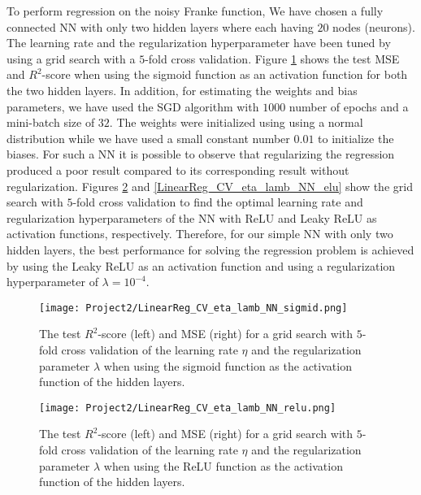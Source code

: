 \documentclass[a4paper]{article}
\begin{document}
To perform regression on the noisy Franke function, We have chosen a fully connected NN with only two hidden layers where each having $20$ nodes (neurons). The learning rate and the regularization hyperparameter have been tuned by using a grid search with a $5$-fold cross validation. Figure \ref{LinearReg_CV_eta_lamb_NN} shows the test MSE and $R^2$-score when using the sigmoid function as an activation function for both the two hidden layers. In addition, for estimating the weights and bias parameters, we have used the SGD algorithm with $1000$ number of epochs and a mini-batch size of $32$. The weights were initialized using using a normal distribution while we have used a small constant number $0.01$ to initialize the biases. For such a NN it is possible to observe that regularizing the regression produced a poor result compared to its corresponding result without regularization. Figures \ref{LinearReg_CV_eta_lamb_NN_relu} and \ref{LinearReg_CV_eta_lamb_NN_elu} show the grid search with $5$-fold cross validation to find the optimal learning rate and regularization hyperparameters of the NN with ReLU and Leaky ReLU as activation functions, respectively. Therefore, for our simple NN with only two hidden layers, the best performance for solving the regression problem is achieved by using the Leaky ReLU as an activation function and using a regularization hyperparameter of $\lambda=10^{-4}$.

\begin{figure}[H]
  \centering
  \texttt{[image: Project2/LinearReg\_CV\_eta\_lamb\_NN\_sigmid.png]}
  \caption{The test $R^2$-score (left) and MSE (right) for a grid search with $5$-fold cross validation of the learning rate $\eta$ and the regularization parameter $\lambda$ when using the sigmoid function as the activation function of the hidden layers.}
    \label{LinearReg_CV_eta_lamb_NN}
\end{figure}

\begin{figure}[H]
  \centering
  \texttt{[image: Project2/LinearReg\_CV\_eta\_lamb\_NN\_relu.png]}
  \caption{The test $R^2$-score (left) and MSE (right) for a grid search with $5$-fold cross validation of the learning rate $\eta$ and the regularization parameter $\lambda$ when using the ReLU function as the activation function of the hidden layers.}
    \label{LinearReg_CV_eta_lamb_NN_relu}
\end{figure}
\end{document}
